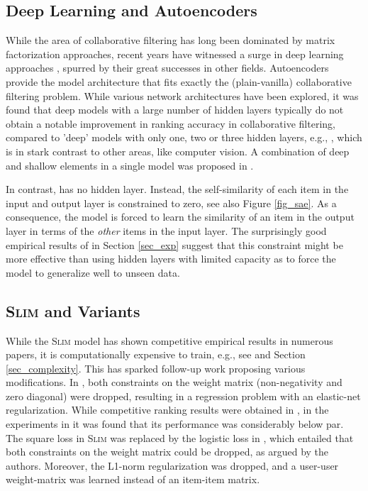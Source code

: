 \documentclass[sigconf]{acmart}
\newcommand{\slim}{{\scshape Slim}}
\newcommand{\sae}{}
\begin{document}
\subsection{Deep Learning and Autoencoders}
While the area of collaborative filtering has long  been dominated by matrix factorization approaches, recent years have witnessed a surge in deep learning approaches \cite{liang18,sedhain15, zheng16,wu16,he17, hidasi15,hidasi17, cheng16}, spurred by their great successes in other fields. Autoencoders provide the model architecture that fits exactly the (plain-vanilla) collaborative filtering problem. While various network architectures have been explored, it was found that deep models with a large number of hidden layers typically do not obtain a notable improvement in  ranking accuracy in collaborative filtering, compared to 'deep' models with only one, two or three hidden layers, e.g.,  \cite{sedhain15, zheng16,he17,  liang18}, which is in stark contrast to other areas, like computer vision. A combination of deep and shallow elements in a single model was proposed in \cite{cheng16}.

In contrast, \sae{}  has no hidden layer. Instead, the self-similarity of each item in the input and output layer is constrained to zero, see also Figure \ref{fig_sae}. As a consequence, the model is forced to learn the similarity of an item in the output layer in terms of the \emph{other} items in the input layer. The surprisingly good empirical results of \sae{}  in Section \ref{sec_exp} suggest that this constraint might be more effective than using hidden layers with limited capacity as to force the model to generalize well to unseen data. 


\subsection{\slim{}  and Variants}
While the \slim{} model \cite{ning11} has shown competitive empirical results in numerous papers, it is  computationally expensive to train, e.g., see  \cite{ning11,liang18} and Section \ref{sec_complexity}. This has sparked follow-up work proposing various modifications. In \cite{levy13}, both constraints on the weight matrix (non-negativity and zero diagonal) were dropped, resulting in a regression problem with an elastic-net regularization.   While competitive ranking results were obtained  in \cite{levy13}, in the experiments in \cite{liang18} it was found that its performance was considerably below par.
The square loss in \slim{} was replaced by the logistic loss in \cite{sedhain16}, which entailed that both constraints on the weight matrix could be dropped, as argued by the authors. Moreover,  the L1-norm regularization was dropped, and a user-user weight-matrix was learned instead of an item-item  matrix. 
\end{document}

